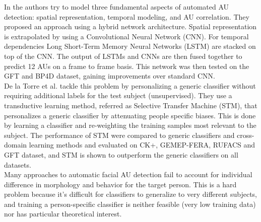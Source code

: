 In \cite{AU_LSTM} the authors try to model three fundamental aspects of automated AU detection: spatial representation, temporal modeling, and AU correlation. They proposed an approach using a hybrid network architecture. Spatial representation is extrapolated by using a Convolutional Neural Network (CNN). For temporal dependencies Long Short-Term Memory Neural Networks (LSTM) are stacked on top of the CNN. The output of LSTMs and CNNs are then fused together to predict 12 AUs on a frame to frame basis. This network was then tested on the GFT and BP4D dataset, gaining improvements over standard CNN.\\

De la Torre et al. \cite{AU_STM} \cite{AU_STM2} tackle this problem by personalizing a generic classifier without requiring additional labels for the test subject (unsupervised). They use a transductive learning method, referred as Selective Transfer Machine (STM), that personalizes a generic classifier by attenuating people specific biases. This is done by  learning a classifier and re-weighting the training samples most relevant to the subject. The performance of STM were compared to generic classifiers and cross-domain learning methods and evaluated on CK+, GEMEP-FERA, RUFACS and GFT dataset, and STM is shown to outperform the generic classifiers on all datasets.\\ 

Many approaches to automatic facial AU detection fail to account for individual difference in morphology and behavior for the target person. This is a hard problem because it's difficult for classifiers to generalize to very different subjects, and training a person-specific classifier is neither feasible (very low training data) nor has particular theoretical interest. \\

\pagebreak


